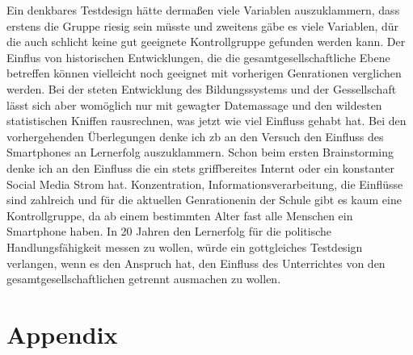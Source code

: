 Ein denkbares Testdesign hätte dermaßen viele Variablen auszuklammern, dass erstens die Gruppe riesig sein müsste und zweitens gäbe es viele Variablen, dür die auch schlicht keine gut geeignete Kontrollgruppe gefunden werden kann. Der Einflus von historischen Entwicklungen, die die gesamtgesellschaftliche Ebene betreffen können vielleicht noch geeignet mit vorherigen Genrationen verglichen werden. Bei der steten Entwicklung des Bildungssystems und der Gessellschaft lässt sich aber womöglich nur mit gewagter Datemassage und den wildesten statistischen Kniffen rausrechnen, was jetzt wie viel Einfluss gehabt hat. 
Bei den vorhergehenden Überlegungen denke ich \gls{zb} an den Versuch den Einfluss des Smartphones an Lernerfolg auszuklammern. Schon beim ersten Brainstorming denke ich an den Einfluss die ein stets griffbereites Internt oder ein konstanter Social Media Strom hat. Konzentration, Informationsverarbeitung, die Einflüsse sind zahlreich und für die aktuellen Genrationenin der Schule gibt es kaum eine Kontrollgruppe, da ab einem bestimmten Alter fast alle Menschen ein Smartphone haben. In 20 Jahren den Lernerfolg für die politische Handlungsfähigkeit messen zu wollen, würde ein gottgleiches Testdesign verlangen, wenn es den Anspruch hat, den Einfluss des Unterrichtes von den gesamtgesellschaftlichen getrennt ausmachen zu wollen. 



\clearpage
\newpage
\printbibliography[title=Literaturverzeichnis, heading=bibintoc, nottype=unused] 

\appendix %

\section{Appendix}
